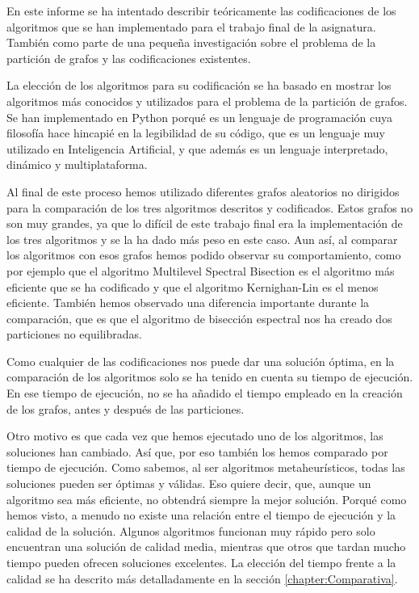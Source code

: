 En este informe se ha intentado describir teóricamente las codificaciones de los algoritmos que se han implementado para el trabajo final de la asignatura. También como parte de una pequeña investigación sobre el problema de la partición de grafos y las codificaciones existentes.

La elección de los algoritmos para su codificación se ha basado en mostrar los algoritmos más conocidos y utilizados para el problema de la partición de grafos. Se han implementado en Python porqué es un lenguaje de programación cuya filosofía hace hincapié en la legibilidad de su código, que es un lenguaje muy utilizado en Inteligencia Artificial, y que además es un lenguaje interpretado, dinámico y multiplataforma. 

Al final de este proceso hemos utilizado diferentes grafos aleatorios no dirigidos para la comparación de los tres algoritmos descritos y codificados. Estos grafos no son muy grandes, ya que lo difícil de este trabajo final era la implementación de los tres algoritmos y se la ha dado más peso en este caso. Aun así, al comparar los algoritmos con esos grafos hemos podido observar su comportamiento, como por ejemplo que el algoritmo Multilevel Spectral Bisection es el algoritmo más eficiente que se ha codificado y que el algoritmo Kernighan-Lin es el menos eficiente. También hemos observado una diferencia importante durante la comparación, que es que el algoritmo de bisección espectral nos ha creado dos particiones no equilibradas.

Como cualquier de las codificaciones nos puede dar una solución óptima, en la comparación de los algoritmos solo se ha tenido en cuenta su tiempo de ejecución. En ese tiempo de ejecución, no se ha añadido el tiempo empleado en la creación de los grafos, antes y después de las particiones. 

Otro motivo es que cada vez que hemos ejecutado uno de los algoritmos, las soluciones han cambiado. Así que, por eso también los hemos comparado por tiempo de ejecución. Como sabemos, al ser algoritmos metaheurísticos, todas las soluciones pueden ser óptimas y válidas. Eso quiere decir, que, aunque un algoritmo sea más eficiente, no obtendrá siempre la mejor solución. Porqué como hemos visto, a menudo no existe una relación entre el tiempo de ejecución y la calidad de la solución. Algunos algoritmos funcionan muy rápido pero solo encuentran una solución de calidad media, mientras que otros que tardan mucho tiempo pueden ofrecen soluciones excelentes. La elección del tiempo frente a la calidad se ha descrito más detalladamente en la sección \ref{chapter:Comparativa}.

